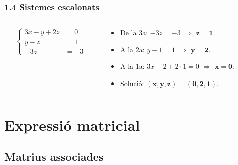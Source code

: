 \documentclass[aspectratio=169]{beamer}
\newcommand{\solucio}[1]{{\color{margueVerdFosc}\ensuremath{\mathbf{#1}}}}
\begin{document}
\begin{frame}[t]
  \frametitle{1.4 Sistemes escalonats}

  \vspace{-0.3cm}
  \begin{columns}[T,onlytextwidth]
    \begin{column}{0.40\textwidth}
      \[
        \left\{\begin{aligned}
          3x - y + 2z &= 0 \\
          y - z &= 1 \\
          -3z &= -3
        \end{aligned}\right.
      \]
    \end{column}

    \begin{column}{0.58\textwidth}
      \begin{itemize}
        \item<1-> De la 3a: $-3z=-3$ \;$\Rightarrow$\; \solucio{z=1}.
        \item<2-> A la 2a: $y-1=1$ \;$\Rightarrow$\; \solucio{y=2}.
        \item<3-> A la 1a: $3x-2+2\cdot 1=0$ \;$\Rightarrow$\; \solucio{x=0}.
        \item<4-> Solució: \solucio{(x,y,z)=(0,2,1)}.
      \end{itemize}
    \end{column}
  \end{columns}
\end{frame}

\section{Expressió matricial}
\subsection{Matrius associades}
\end{document}
